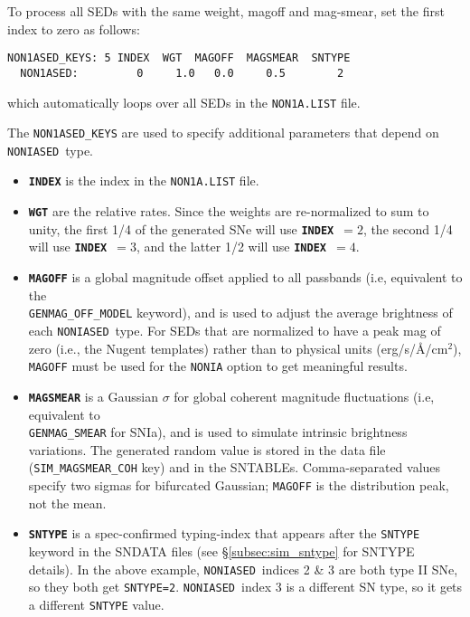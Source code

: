 \documentclass[12pt]{article}
\newcommand{\NONIA}{{\tt NONIASED}}
\newcommand{\indx}{{\bf\tt INDEX}}
\begin{document}
To process all SEDs with the same weight, magoff and mag-smear,
set the first index to zero as follows:
\begin{Verbatim}[frame=single]
  NON1ASED_KEYS: 5 INDEX  WGT  MAGOFF  MAGSMEAR  SNTYPE
  NON1ASED:         0     1.0   0.0     0.5        2
\end{Verbatim}
%
which automatically loops over all SEDs in the {\tt NON1A.LIST} file.

\clearpage
\medskip
The {\tt NON1ASED\_KEYS} are used to specify additional parameters 
that depend on \NONIA\ type. 
\begin{itemize}
 \item {\tt\bf INDEX} is the index in the {\tt NON1A.LIST} file.
%
 \item {\tt\bf WGT} are the relative rates.
   Since the weights are re-normalized to sum to unity,
   the first 1/4 of the generated SNe will use \indx\ $=2$,
   the second 1/4 will use \indx\ $=3$,
   and the latter 1/2 will use \indx\ $=4$.
%
  \item {\tt\bf MAGOFF} is a global magnitude offset applied to
     all passbands 
     (i.e, equivalent to the \\ {\tt GENMAG\_OFF\_MODEL} keyword), 
     and is used to adjust the average brightness of each \NONIA\ type.
     For SEDs that are normalized to have a peak mag of zero
     (i.e., the Nugent templates) rather than to physical units
     (erg/s/\AA/cm$^2$), {\tt MAGOFF} must be used for the 
     {\tt NONIA} option to get meaningful results.
%
   \item {\tt\bf MAGSMEAR} is a Gaussian $\sigma$ for global coherent 
        magnitude fluctuations (i.e, equivalent to \\
       {\tt GENMAG\_SMEAR} for SNIa),
       and is used to simulate intrinsic brightness variations.
       The generated random value is stored in the data file
       ({\tt SIM\_MAGSMEAR\_COH} key) and in the SNTABLEs.
       Comma-separated values specify two sigmas for bifurcated Gaussian;
       {\tt MAGOFF} is the distribution peak, not the mean.
%
  \item {\tt\bf SNTYPE} is a spec-confirmed typing-index that appears
       after the {\tt SNTYPE} keyword in the 
       SNDATA files (see \S\ref{subsec:sim_sntype} for SNTYPE details).
       In the above example, \NONIA\ indices 2 \& 3 are both 
       type II SNe, so they both get {\tt SNTYPE=2}.
       \NONIA\ index 3 is a different SN type, so it gets a different
       {\tt SNTYPE} value.  
\end{itemize}
\end{document}
